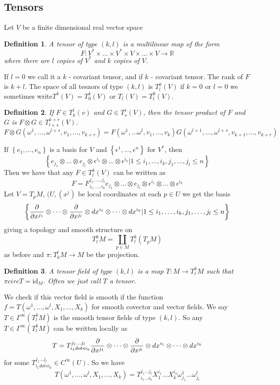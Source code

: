 \documentclass[a4paper]{article}
\newtheorem*{defn}{Definition}
\begin{document}
\subsection*{Tensors}%
Let $V$ be a finite dimensional real vector space

\begin{defn}
  A tensor of type $(k,l)$ is a multilinear map of the form 
  \[
    F: V^* \times \dots \times V^* \times V \times \dots \times V \rightarrow \mathds{R}
  \]
  where there are $l$ copies of $V^*$ and $k$ copies of $V$.
\end{defn}
If $l = 0$ we call it a $k$ - covariant tensor, and if $k$ - covariant tensor. The rank of $F$ is $k + l$. The space of all tesnors of type $(k,l)$ is $T^k_l(V)$ if $k=0$ or $l=0$ we sometimes write$T^k(V) = T^k_0(V)$ or $T_l(V) = T_l^0(V)$.

\begin{defn}
  If $F \in T_k^l(v)$ and $G \in T_s^r(V)$, then the tensor product of $F$ and $G$ is $F \otimes G \in T_{l + s}^{k+r}(V)$.
  \[
    F \otimes G(\omega^1, \dots, \omega^{l+s}, v_1, \dots, v_{k+r}) = F(\omega^1, \dots \omega^l, v_1, \dots, v_k)G(\omega^{l+1}, \dots, \omega^{l+s}, v_{k+1}, \dots, v_{k+r})
  \]
\end{defn}

If $\left\{ e_1, \dots, e_n \right\}$ is a basis for $V$ and $\left\{ \epsilon^1, \dots, \epsilon^n \right\}$ for $V^*$, then
\[
  \left\{ e_{j_1} \otimes \dots \otimes e_{j_l} \otimes \epsilon^{i_1} \otimes \dots \otimes \epsilon^{i_k} | 1 \leq i_1, \dots, i_k, j_1, \dots, j_l \leq n \right\}
\]
Then we have that any $F \in T_l^k(V)$ can be written as
\[
  F = F^{j_1, \dots, j_l}_{i_1, \dots, i_k} e_{j_1} \otimes \dots \otimes e_{j_l} \otimes \epsilon^{i_1} \otimes \dots \otimes \epsilon^{i_k}
\]
Let $V = T_pM$, $(U, (x^j)$ be local coordinates at each $p \in U$ we get the basis
\[
  \left\{ \pdv{x^{j_1}} \otimes \dots \otimes \pdv{x^{j_l}} \otimes dx^{i_1} \otimes \dots \otimes dx^{i_k} | 1 \leq i_1, \dots, i_k, j_1, \dots, j_l \leq n \right\}
\]
giving a topology and smooth structure on
\[
  T_l^kM = \coprod_{p \in M} T_l^k (T_pM)
\]
as before and $\pi:T_k^lM \rightarrow M$ be the projection.

\begin{defn}
  A tensor field of type $(k,l)$ is a map $T: M \rightarrow T_l^kM$ such that $\pi circ T = \text{id}_M$. Often we just call $T$ a tensor. 
\end{defn}

We check if this vector field is smooth if the function $f = T(\omega^1, \dots, \omega^l, X_1, \dots, X_k)$ for smooth covector and vector fields. We say $T \in \Gamma^{\infty}(T_l^kM)$ is the smooth tensor fields of type $(k,l)$. So any $T \in \Gamma^{\infty}(T_l^kM)$ can be written locally as
\[
  T = T_{i_1 dots i_k}^{j_1 \dots j_l} \pdv{x^{j_1}} \otimes \dots \otimes \pdv{x^{j_l}} \otimes dx^{i_1} \otimes \dots \otimes dx^{i_k} 
\]
for some $T_{i_1 dots i_k}^{j_1 \dots j_l} \in C^{\infty}(U)$. So we have
\[
  T(\omega^1, \dots, \omega^l, X_{1}, \dots, X_k) = T_{i_1 \dots i_k}^{j_1 \dots j_l} X_1^{i_1} \dots X_k^{i_k} \omega_{j_1}^1 \dots \omega_{j_l}^l
\]
\end{document}
